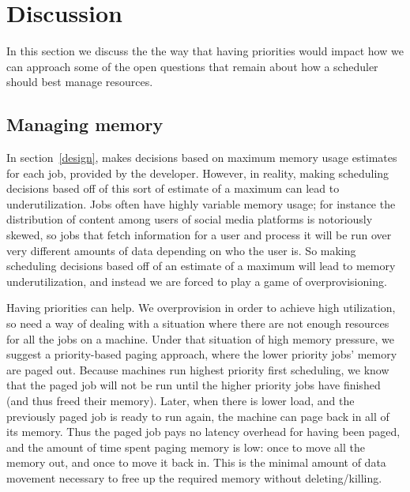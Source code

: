 \section{Discussion}

In this section we discuss the the way that having priorities would impact how
we can approach some of the open questions that remain about how a scheduler
should best manage resources.


\subsection{Managing memory}

In section~\ref{design}, \sys{} makes decisions based on maximum memory usage
estimates for each job, provided by the developer. However, in reality, making
scheduling decisions based off of this sort of estimate of a maximum can lead to
underutilization. Jobs often have highly variable memory usage; for instance the
distribution of content among users of social media platforms is notoriously
skewed\cite{TODO}, so jobs that fetch information for a user and process it will
be run over very different amounts of data depending on who the user is. So
making scheduling decisions based off of an estimate of a maximum will lead to
memory underutilization, and instead we are forced to play a game of
overprovisioning.

Having priorities can help. We overprovision in order to achieve high
utilization, so need a way of dealing with a situation where there are not
enough resources for all the jobs on a machine. Under that situation of high
memory pressure, we suggest a priority-based paging approach, where the lower
priority jobs' memory are paged out. Because machines run highest priority first
scheduling, we know that the paged job will not be run until the higher priority
jobs have finished (and thus freed their memory). Later, when there is lower load, and the
previously paged job is ready to run again, the machine can page back in all of
its memory. Thus the paged job pays no latency overhead for having been paged,
and the amount of time spent paging memory is low: once to move all the memory
out, and once to move it back in. This is the minimal amount of data movement
necessary to free up the required memory without deleting/killing.



